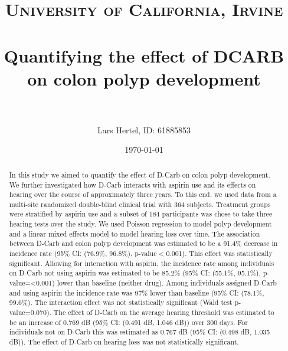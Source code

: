 \documentclass[paper=a4, fontsize=11pt]{scrartcl} %
\title{	
\normalfont \normalsize 
\textsc{University of California, Irvine} \\ [25pt] %
\horrule{0.5pt} \\[0.4cm] %
\huge Quantifying the effect of DCARB on colon polyp development\\ %
\horrule{2pt} \\[0.5cm] %
}
\author{Lars Hertel,
	ID: 61885853\\} %
\date{\normalsize\today} %
\numberwithin{equation}{section} %
\numberwithin{figure}{section} %
\numberwithin{table}{section} %
\begin{document}
\maketitle %

\begin{abstract}
In this study we aimed to quantify the effect of D-Carb on colon polyp development. We further investigated how D-Carb interacts with aspirin use and its effects on hearing over the course of approximately three years. To this end, we used data from a multi-site randomized double-blind clinical trial with 364 subjects. Treatment groups were stratified by aspirin use and a subset of 184 participants was chose to take three hearing tests over the study. We used Poisson regression to model polyp development and a linear mixed effects model to model hearing loss over time. The association between D-Carb and colon polyp development was estimated to be a 91.4\% decrease in incidence rate (95\% CI: (76.9\%, 96.8\%), p-value$<$0.001). This effect was statistically significant. Allowing for interaction with aspirin, the incidence rate among individuals on D-Carb not using aspirin was estimated to be 85.2\% (95\% CI: (55.1\%, 95.1\%), p-value=<0.001) lower than baseline (neither drug). Among individuals assigned D-Carb and using aspirin the incidence rate was 97\% lower than baseline (95\% CI: (78.1\%, 99.6\%). The interaction effect was not statistically significant (Wald test p-value=0.070). The effect of D-Carb on the average hearing threshold was estimated to be an increase of 0.769 dB (95\% CI: (0.491 dB, 1.046 dB)) over 300 days. For individuals not on D-Carb this was estimated as 0.767 dB (95\% CI: (0.498 dB, 1.035 dB)). The effect of D-Carb on hearing loss was not statistically significant.
\end{abstract}
\end{document}
